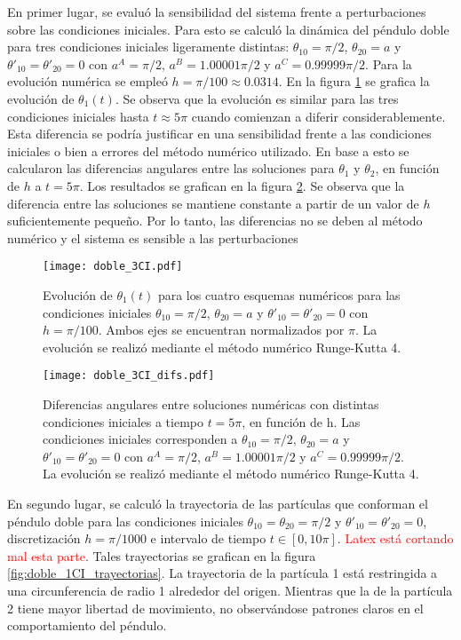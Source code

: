 \documentclass[aps,prb,twocolumn,superscriptaddress,floatfix,longbibliography]{revtex4-2}
\newcounter{para}
\begin{document}
En primer lugar, se evaluó la sensibilidad del sistema frente a perturbaciones sobre las condiciones iniciales. Para esto se calculó la dinámica del péndulo doble para tres condiciones iniciales ligeramente distintas: $\theta_{1 0} = \pi/2$, $\theta_{2 0} = a$ y $\theta'_{1 0} = \theta'_{2 0} = 0$ con $a^A = \pi/2$, $a^B = 1.00001 \pi/2$ y $a^C = 0.99999 \pi/2$. Para la evolución numérica se empleó $h = \pi/100 \approx 0.0314$. En la figura \ref{fig:doble_3CI} se grafica la evolución de $\theta_1(t)$. Se observa que la evolución es similar para las tres condiciones iniciales hasta $t \approx 5 \pi$ cuando comienzan a diferir considerablemente. Esta diferencia se podría justificar en una sensibilidad frente a las condiciones iniciales o bien a errores del método numérico utilizado. En base a esto se calcularon las diferencias angulares entre las soluciones para $\theta_1$ y $\theta_2$, en función de $h$ a $t = 5 \pi$. Los resultados se grafican en la figura \ref{fig:doble_3CI_difs}. Se observa que la diferencia entre las soluciones se mantiene constante a partir de un valor de $h$ suficientemente pequeño. Por lo tanto, las diferencias no se deben al método numérico y el sistema es sensible a las perturbaciones

\begin{figure}[h]
  \texttt{[image: doble\_3CI.pdf]}
  \caption{Evolución de $\theta_1(t)$ para los cuatro esquemas numéricos para las condiciones iniciales $\theta_{1 0} = \pi/2$, $\theta_{2 0} = a$ y $\theta'_{1 0} = \theta'_{2 0} = 0$ con $h = \pi/100$. Ambos ejes se encuentran normalizados por $\pi$. La evolución se realizó mediante el método numérico Runge-Kutta 4.}
   \label{fig:doble_3CI}
\end{figure}


\begin{figure}[h]
  \texttt{[image: doble\_3CI\_difs.pdf]}
  \caption{Diferencias angulares entre soluciones numéricas con distintas condiciones iniciales a tiempo $t = 5 \pi$, en función de h. Las condiciones iniciales corresponden a $\theta_{1 0} = \pi/2$, $\theta_{2 0} = a$ y $\theta'_{1 0} = \theta'_{2 0} = 0$ con $a^A = \pi/2$, $a^B = 1.00001 \pi/2$ y $a^C = 0.99999 \pi/2$. La evolución se realizó mediante el método numérico Runge-Kutta 4.}
   \label{fig:doble_3CI_difs}
\end{figure}

En segundo lugar, se calculó la trayectoria de las partículas que conforman el péndulo doble para las condiciones iniciales $\theta_{1 0} = \theta_{2 0} = \pi/2$ y $\theta'_{1 0} = \theta'_{2 0} = 0$, discretización $h = \pi/1000$ e intervalo de tiempo $t \in [0, 10 \pi]$. \textcolor{red}{Latex está cortando mal esta parte}. Tales trayectorias se grafican en la figura \ref{fig:doble_1CI_trayectorias}. La trayectoria de la partícula 1 está restringida a una circunferencia de radio 1 alrededor del origen. Mientras que la de la partícula 2 tiene mayor libertad de movimiento, no observándose patrones claros en el comportamiento del péndulo.
\end{document}
